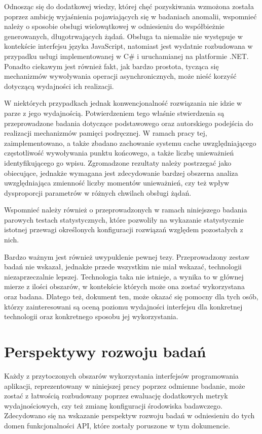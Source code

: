 Odnosząc się do dodatkowej wiedzy, której chęć pozyskiwania wzmożona została poprzez ambicję wyjaśnienia pojawiających się w badaniach anomalii, wspomnieć należy o sposobie obsługi wielowątkowej w odniesieniu do współbieżnie generowanych, długotrwających żądań. Obsługa ta niemalże nie występuje w kontekście interfejsu języka JavaScript, natomiast jest wydatnie rozbudowana w przypadku usługi implementowanej w C\# i uruchamianej na platformie .NET. Ponadto ciekawym jest również fakt, jak bardzo prostota, tycząca się mechanizmów wywoływania operacji asynchronicznych, może nieść korzyść dotyczącą wydajności ich realizacji.

W niektórych przypadkach jednak konwencjonalność rozwiązania nie idzie w parze z jego wydajnością. Potwierdzeniem tego właśnie stwierdzenia są przeprowadzone badania dotyczące podstawowego oraz autorskiego podejścia do realizacji mechanizmów pamięci podręcznej. W ramach pracy tej, zaimplementowano, a także zbadano zachowanie systemu cache uwzględniającego częstotliwość wywoływania punktu końcowego, a także liczbę unieważnień identyfikującego go wpisu. Zgromadzone rezultaty należy postrzegać jako obiecujące, jednakże wymagana jest zdecydowanie bardzej obszerna analiza uwzględniająca zmienność liczby momentów unieważnień, czy też wpływ dysproporcji parametrów w różnych chwilach obsługi żądań.

Wspomnieć należy również o przeprowadzonych w ramach niniejszego badania parowych testach statystycznych, które pozwoliły na wykazanie statystycznie istotnej przewagi określonych konfiguracji rozwiązań względem pozostałych z nich. 

Bardzo ważnym jest również uwypuklenie pewnej tezy. Przeprowadzony zestaw badań nie wskazał, jednakże przede wszystkim nie miał wskazać, technologii niezaprzeczalnie lepszej. Technologia taka nie istnieje, a wynika to w głównej mierze z ilości obszarów, w kontekście których może ona zostać wykorzystana oraz badana. Dlatego też, dokument ten, może okazać się pomocny dla tych osób, którzy zainteresowani są oceną poziomu wydajności interfejsu dla konkretnej technologii oraz konkretnego sposobu jej wykorzystania.
\section{Perspektywy rozwoju badań}
Każdy z przytoczonych obszarów wykorzystania interfejsów programowania aplikacji, reprezentowany w niniejszej pracy poprzez odmienne badanie, może zostać z łatwością rozbudowany poprzez ewaluację dodatkowych metryk wydajnościowych, czy też zmianę konfiguracji środowiska badawczego. Zdecydowano się na wskazanie perspektyw rozwoju badań w odniesieniu do tych domen funkcjonalności API, które zostały poruszone w tym dokumencie.

